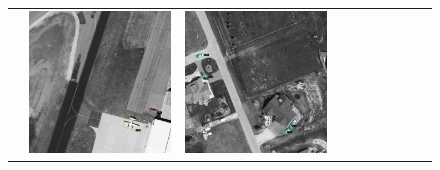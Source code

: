 \begin{figure}[h!]
\begin{tabularx}{\textwidth}{c|*{9}{X}}
    &  \includegraphics[trim={650pt 120pt 170pt 720pt},clip,width=\linewidth]{images/015Results/03ablation/comp_images/red/487.png}
    & \includegraphics[trim={230pt 200pt 680pt 725pt},clip,width=\linewidth]{images/015Results/03ablation/comp_images/red/509.png}

\end{tabularx}
\end{figure}
